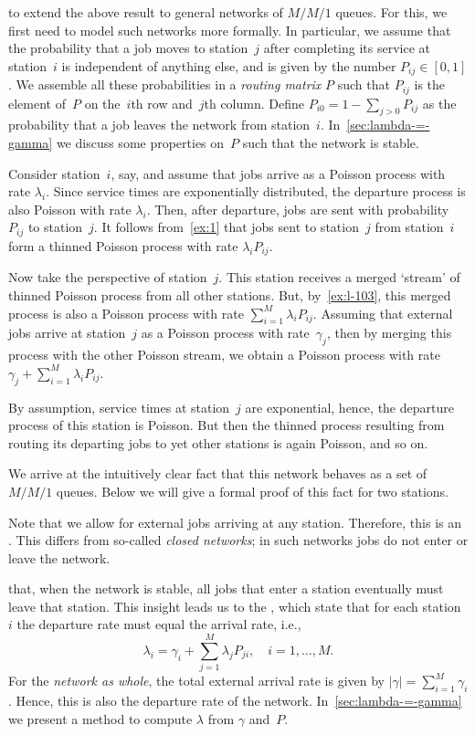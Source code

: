 \documentclass[queueing-book.tex]{subfiles}
\begin{document}
 to extend the above result to general networks of $M/M/1$ queues.
For this, we first need to model such networks more formally.
In particular, we assume that the probability that a job moves to station~$j$ after completing its service at station~$i$ is independent of anything else, and is given by the number $P_{i j}\in[0,1]$.
We assemble all these probabilities in a \emph{routing matrix} $P$ such that $P_{i j}$ is the element of~$P$ on the~$i$th row and~$j$th column.
Define $P_{i0} = 1-\sum_{j>0}P_{ij}$ as the probability that a job leaves the network from station~$i$.
In~\cref{sec:lambda-=-gamma} we discuss some properties on~$P$ such that the  network is stable.

Consider station~$i$, say, and assume that jobs arrive as a Poisson process with rate $\lambda_i$.
Since service times are exponentially distributed, the departure process is also Poisson with rate $\lambda_i$.
Then, after departure, jobs are sent with probability $P_{i j}$ to station~$j$.
It follows from~\cref{ex:1} that jobs sent to station~$j$ from station~$i$ form a thinned Poisson process with rate $\lambda_i P_{i j}$.

Now take the perspective of station~$j$.
This station receives a merged `stream' of thinned Poisson process from all other stations.
But, by~\cref{ex:l-103}, this merged process is also a Poisson process with rate $\sum_{i=1}^{M}\lambda_i P_{ij}$.
Assuming that external jobs arrive at station~$j$ as a Poisson process with rate~$\gamma_j$, then by
merging this process with the other Poisson stream, we obtain a Poisson process with rate $\gamma_j + \sum_{i=1}^M \lambda_i P_{i j}$.

By assumption, service times at station~$j$ are exponential, hence, the departure process of this station is Poisson.
But then the thinned process resulting from routing its departing jobs to yet other stations is again Poisson, and so on.

We arrive at the intuitively clear fact that this network behaves as a set of $M/M/1$ queues. Below we will give a formal proof of this fact for two stations.


Note that we allow for external jobs arriving at any station.
Therefore, this is an .
This differs from so-called \emph{closed networks}; in such networks jobs do not enter or leave the network.

 that, when the network is stable, all jobs that enter a station eventually must leave that station.
This insight leads us to the , which state that for each station~$i$ the departure rate must equal the arrival rate, i.e.,
\begin{equation}\label{eq:101}
  \lambda_i = \gamma_i + \sum_{j=1}^M \lambda_j P_{j i}, \quad i = 1, \ldots, M.
\end{equation}
For the \emph{network as whole}, the total external arrival rate is given by $|\gamma|= \sum_{i=1}^M \gamma_i$.
Hence, this is also the departure rate of the network. In~\cref{sec:lambda-=-gamma} we present a method to compute $\lambda$ from $\gamma$ and~$P$.
\end{document}
